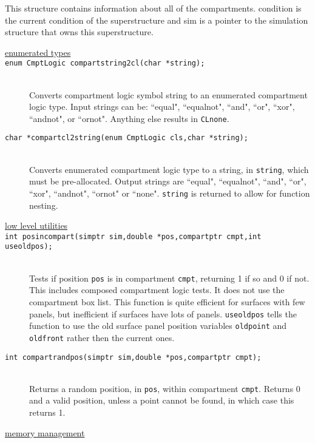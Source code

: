 \documentclass {book}
\begin{document}
This structure contains information about all of the compartments. condition is the current condition of the superstructure and sim is a pointer to the simulation structure that owns this superstructure.

\begin{description}

\item[\underline{enumerated types}]

\item[\texttt{enum CmptLogic compartstring2cl(char *string);}]
\hfill \\
Converts compartment logic symbol string to an enumerated compartment logic type. Input strings can be: ``equal", ``equalnot", ``and", ``or", ``xor", ``andnot", or ``ornot". Anything else results in \texttt{CLnone}.

\item[\texttt{char *compartcl2string(enum CmptLogic cls,char *string);}]
\hfill \\
Converts enumerated compartment logic type to a string, in \texttt{string}, which must be pre-allocated. Output strings are ``equal", ``equalnot", ``and", ``or", ``xor", ``andnot", ``ornot" or ``none". \texttt{string} is returned to allow for function nesting.

\item[\underline{low level utilities}]

\item[\texttt{int posincompart(simptr sim,double *pos,compartptr cmpt,int useoldpos);}]
\hfill \\
Tests if position \texttt{pos} is in compartment \texttt{cmpt}, returning 1 if so and 0 if not. This includes composed compartment logic tests. It does not use the compartment box list. This function is quite efficient for surfaces with few panels, but inefficient if surfaces have lots of panels. \texttt{useoldpos} tells the function to use the old surface panel position variables \texttt{oldpoint} and \texttt{oldfront} rather then the current ones.

\item[\texttt{int compartrandpos(simptr sim,double *pos,compartptr cmpt);}]
\hfill \\
Returns a random position, in \texttt{pos}, within compartment \texttt{cmpt}. Returns 0 and a valid position, unless a point cannot be found, in which case this returns 1.

\item[\underline{memory management}]


\end{description}
\end{document}
